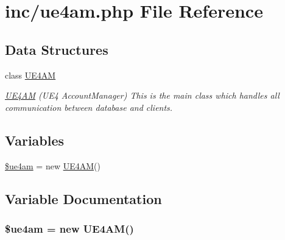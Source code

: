 \hypertarget{inc_2ue4am_8php}{\section{inc/ue4am.php File Reference}
\label{inc_2ue4am_8php}
}
\subsection*{Data Structures}
\begin{DoxyCompactItemize}
\item 
class \hyperlink{class_u_e4_a_m}{U\-E4\-A\-M}
\begin{DoxyCompactList}\small\item\em \hyperlink{class_u_e4_a_m}{U\-E4\-A\-M} (U\-E4 Account\-Manager) This is the main class which handles all communication between database and clients. \end{DoxyCompactList}\end{DoxyCompactItemize}
\subsection*{Variables}
\begin{DoxyCompactItemize}
\item 
\hyperlink{inc_2ue4am_8php_a3dfff02924aea9d56d3b36fd92e79836}{\$ue4am} = new \hyperlink{class_u_e4_a_m}{U\-E4\-A\-M}()
\end{DoxyCompactItemize}


\subsection{Variable Documentation}
\hypertarget{inc_2ue4am_8php_a3dfff02924aea9d56d3b36fd92e79836}{
\subsubsection[{\$ue4am}]{\setlength{\rightskip}{0pt plus 5cm}\$ue4am = new {\bf U\-E4\-A\-M}()}}\label{inc_2ue4am_8php_a3dfff02924aea9d56d3b36fd92e79836}
